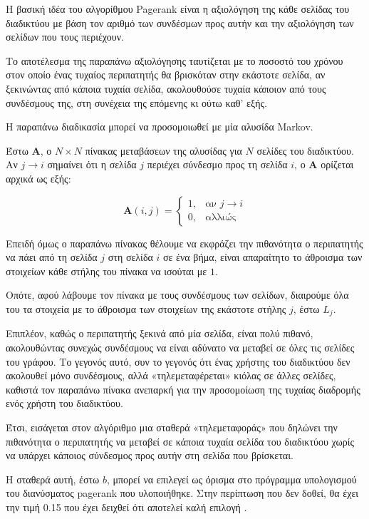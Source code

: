 Η βασική ιδέα του αλγορίθμου Pagerank είναι η αξιολόγηση της κάθε σελίδας του διαδικτύου με βάση τον αριθμό των συνδέσμων προς αυτήν και την αξιολόγηση των σελίδων που τους περιέχουν.

Το αποτέλεσμα της παραπάνω αξιολόγησης ταυτίζεται με το ποσοστό του χρόνου στον οποίο ένας τυχαίος περιπατητής θα βρισκόταν στην εκάστοτε σελίδα, αν ξεκινώντας από κάποια τυχαία σελίδα, ακολουθούσε τυχαία κάποιον από τους συνδέσμους της, στη συνέχεια της επόμενης κι ούτω καθ' εξής.

Η παραπάνω διαδικασία μπορεί να προσομοιωθεί με μία αλυσίδα Markov.

Έστω $\bm{A}$, ο $N\times N$  πίνακας μεταβάσεων της αλυσίδας για $N$ σελίδες του διαδικτύου. Αν  $ j\rightarrow i$ σημαίνει ότι η σελίδα $j$ περιέχει σύνδεσμο προς τη σελίδα $i$, ο $\bm{A}$ ορίζεται αρχικά ως εξής:

\[
  \bm{A}(i, j) = 
  \begin{cases}
    1, & \text{αν } j\rightarrow i \\
    0, & \text{αλλιώς }
  \end{cases}
\]

Επειδή όμως ο παραπάνω πίνακας θέλουμε να εκφράζει την πιθανότητα ο περιπατητής να πάει από τη σελίδα $j$ στη σελίδα $i$ σε ένα βήμα, είναι απαραίτητο το άθροισμα των στοιχείων κάθε στήλης του πίνακα να ισούται με $1$.

Οπότε, αφού λάβουμε τον πίνακα με τους συνδέσμους των σελίδων, διαιρούμε όλα του τα στοιχεία με το άθροισμα των στοιχείων της εκάστοτε στήλης $j$, έστω $L_j$.

Επιπλέον, καθώς ο περιπατητής ξεκινά από μία σελίδα, είναι πολύ πιθανό, ακολουθώντας συνεχώς συνδέσμους να είναι αδύνατο να μεταβεί σε όλες τις σελίδες του γράφου. Το γεγονός αυτό, συν το γεγονός ότι ένας χρήστης του διαδικτύου δεν ακολουθεί μόνο συνδέσμους, αλλά «τηλεμεταφέρεται» κιόλας σε άλλες σελίδες, καθιστά τον παραπάνω πίνακα ανεπαρκή για την προσομοίωση της τυχαίας διαδρομής ενός χρήστη του διαδικτύου.

Έτσι, εισάγεται στον αλγόριθμο μια σταθερά «τηλεμεταφοράς» που δηλώνει την πιθανότητα ο περιπατητής να μεταβεί σε κάποια τυχαία σελίδα του διαδικτύου χωρίς να υπάρχει κάποιος σύνδεσμος προς αυτήν στη σελίδα που βρίσκεται.

Η σταθερά αυτή, έστω $b$, μπορεί να επιλεγεί ως όρισμα στο πρόγραμμα υπολογισμού του διανύσματος pagerank που υλοποιήθηκε. Στην περίπτωση που δεν δοθεί, θα έχει την τιμή 0.15 που έχει δειχθεί ότι αποτελεί καλή επιλογή \parencite{kamvar2004adaptive}.


